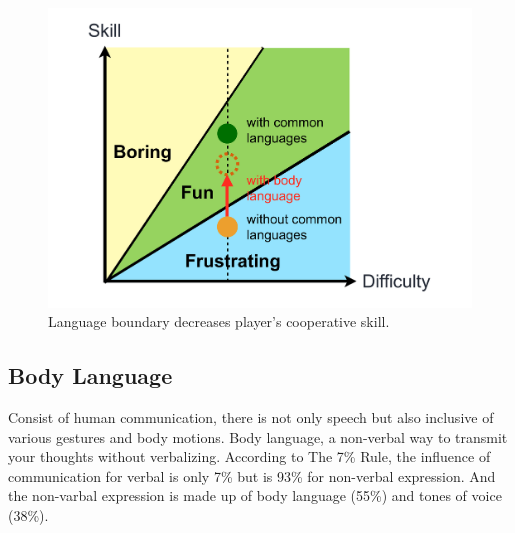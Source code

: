 \begin{figure}[!h]
\centering
\includegraphics[width=0.9\columnwidth]{Figures/GD_F1.pdf}
\caption{Language boundary decreases player's cooperative skill.}
\label{fig:GD_F1}
\end{figure}


\subsection{Body Language}


Consist of human communication, there is not only speech but also inclusive of various gestures and body motions. Body language, a non-verbal way to transmit your thoughts without verbalizing. According to The 7\% Rule\cite{GD2}, the influence of communication for verbal is only 7\% but is 93\% for non-verbal expression. And the non-varbal expression is made up of body language (55\%) and tones of voice (38\%).


